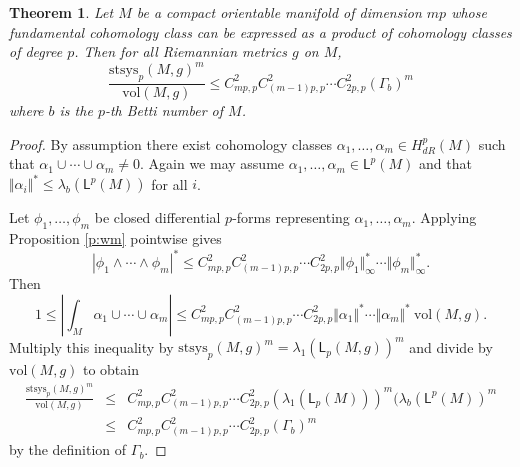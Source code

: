 \documentclass[12pt]{amsart}
\newtheorem{theorem}{Theorem}[section]
\theoremstyle{definition}
\theoremstyle{remark}
\numberwithin{equation}{section}
\begin{document}
\begin{theorem}\label{t:smp}%
Let $M$ be a compact orientable manifold of dimension $mp$ whose fundamental cohomology class can be expressed as a product of cohomology classes of degree $p$. Then for all Riemannian metrics $g$ on $M$,
\begin{equation*}
 \frac {{\mathrm{stsys}_p(M,g)^m}}{\mathrm{vol}(M,g)} \leq C_{mp,p}^2C_{(m-1)p,p}^2 \cdots C_{2p,p}^2 (\Gamma_b)^m
 \end{equation*}
where $b$ is the $p$-th Betti number of $M$.
\end{theorem}
\begin{proof}
By assumption there exist cohomology classes $ \alpha_1, \dots, \alpha_m \in H^p_{dR}(M)$ such that
 $\alpha_1 \cup\cdots\cup \alpha_m \neq 0$. Again we may assume $\alpha_1, \dots ,\alpha_m \in \mathsf{L}^p(M)$ and that 
$\Vert \alpha_i \Vert^\ast \leq \lambda_b(\mathsf{L}^p(M))$ for all $i$.

Let $\phi_1, \dots, \phi_m$ be closed differential $p$-forms representing $\alpha_1, \dots, \alpha_m$. Applying Proposition \ref{p:wm}
pointwise gives 
\begin{equation*}
|\phi_1 \wedge\cdots\wedge \phi_m|^\ast \leq C_{mp,p}^2C_{(m-1)p,p}^2 \cdots C_{2p,p}^2 \Vert \phi_1\Vert_\infty^\ast \cdots \Vert \phi_m\Vert_\infty^\ast.
\end{equation*}
Then
\begin{equation}
1 \leq \left| \int_M \alpha_1\cup\cdots\cup\alpha_m  \right| \leq C_{mp,p}^2C_{(m-1)p,p}^2 \cdots C_{2p,p}^2 \Vert \alpha_1\Vert^\ast \cdots \Vert \alpha_m\Vert^\ast \mathrm{\ vol}(M,g).
\end{equation}
Multiply this inequality by $\mathrm{stsys}_p(M,g)^m = \lambda_1(\mathsf{L}_p(M,g))^m$ and divide by $\mathrm{vol}(M,g)$ to obtain
\begin{eqnarray*}
\frac{ \mathrm{stsys}_p(M,g)^m}{\mathrm{vol}(M,g) }&\leq& C_{mp,p}^2C_{(m-1)p,p}^2 \cdots C_{2p,p}^2 (\lambda_1(\mathsf{L}_p(M)))^m (\lambda_b(\mathsf{L}^p(M))^m\\
&\leq& C_{mp,p}^2C_{(m-1)p,p}^2 \cdots C_{2p,p}^2 (\Gamma_b)^m
\end{eqnarray*}
by the definition of $\Gamma_b$.
\end{proof}
\end{document}
